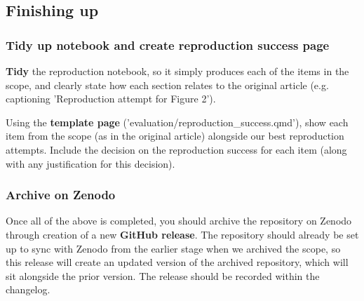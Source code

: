 \vspace{0.5cm}
\subsection{Finishing up}

\subsubsection{Tidy up notebook and create reproduction success page}

\textbf{Tidy} the reproduction notebook, so it simply produces each of the items in the scope, and clearly state how each section relates to the original article (e.g. captioning 'Reproduction attempt for Figure 2').

Using the \textbf{template page} ('evaluation/reproduction\_success.qmd'), show each item from the scope (as in the original article) alongside our best reproduction attempts. Include the decision on the reproduction success for each item (along with any justification for this decision).

\vspace{0.5cm}
\subsubsection{Archive on Zenodo}

Once all of the above is completed, you should archive the repository on Zenodo through creation of a new \textbf{GitHub release}. The repository should already be set up to sync with Zenodo from the earlier stage when we archived the scope, so this release will create an updated version of the archived repository, which will sit alongside the prior version. The release should be recorded within the changelog.